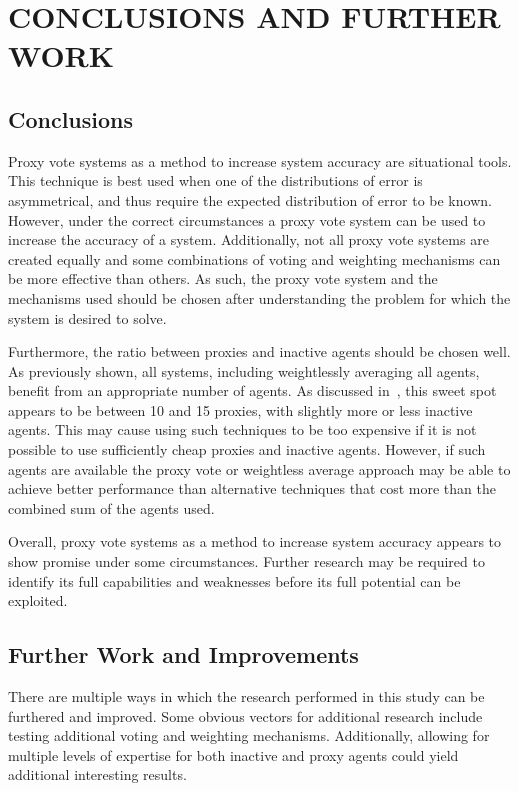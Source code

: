 %
%

\chapter{CONCLUSIONS AND FURTHER WORK}\label{ch:conclusions-and-further-work}

\section{Conclusions}\label{sec:conclusions}
Proxy vote systems as a method to increase system accuracy are situational tools.
This technique is best used when one of the distributions of error is asymmetrical,
and thus require the expected distribution of error to be known.
However, under the correct circumstances a proxy vote system can be used to increase
the accuracy of a system.
Additionally, not all proxy vote systems are created equally and some combinations of
voting and weighting mechanisms can be more effective than others.
As such, the proxy vote system and the mechanisms used should be chosen after
understanding the problem for which the system is desired to solve.

Furthermore, the ratio between proxies and inactive agents should be chosen well.
As previously shown, all systems, including weightlessly averaging all agents, benefit
from an appropriate number of agents.
As discussed in~, this sweet spot appears to be between
10 and 15 proxies, with slightly more or less inactive agents.
This may cause using such techniques to be too expensive if it is not possible to use
sufficiently cheap proxies and inactive agents.
However, if such agents are available the proxy vote or weightless average approach
may be able to achieve better performance than alternative techniques that cost more
than the combined sum of the agents used.

Overall, proxy vote systems as a method to increase system accuracy appears to show
promise under some circumstances.
Further research may be required to identify its full capabilities and weaknesses
before its full potential can be exploited.

\section{Further Work and Improvements}\label{sec:further-work-and-improvements}
There are multiple ways in which the research performed in this study can be
furthered and improved.
Some obvious vectors for additional research include testing additional voting and
weighting mechanisms.
Additionally, allowing for multiple levels of expertise for both inactive and proxy
agents could yield additional interesting results.

